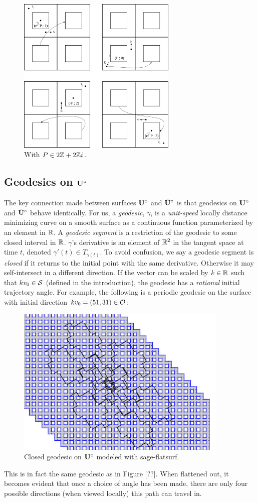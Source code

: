 \documentclass[a4paper, 11pt]{article}
\def\btUs{\btU^\circ}
\begin{document}
\begin{figure}[H]
\centering
\includegraphics[width=3in]{coverdirection.png}
\caption{With $P\in 2\mathbb{Z}+2\mathbb{Z} i$.}
\end{figure}

\noindent 

\subsection{Geodesics on $\mathbf{U}^\circ$}
The key connection made between surfaces $\mathbf{U}^\circ$ and $\btUs$ is that geodesics on $\mathbf{U}^\circ$ and $\btUs$ behave identically. For us, a \emph{geodesic}, $\gamma$, is a \emph{unit-speed} locally distance minimizing curve on a smooth surface as a continuous function parameterized by an element in $\mathbb{R}$. A \emph{geodesic segment} is a restriction of the geodesic to some closed interval in $\mathbb{R}$. $\gamma$'s derivative is an element of $\mathbb{R}^2$ in the tangent space at time $t$, denoted $\gamma'(t)\in T_{\gamma(t)}$. To avoid confusion, we say a geodesic segment is \emph{closed} if it returns to the initial point with the same derivative. Otherwise it may self-intersect in a different direction. If the vector can be scaled by $k\in\mathbb{R}$ such that $kv_0\in\mathcal{S}$ (defined in the introduction), the geodesic has a \emph{rational} initial trajectory angle. For example, the following is a periodic geodesic on the surface with initial direction $kv_0=(51,31)\in\mathcal{O}$:
\begin{figure}[H]
\centering
\includegraphics[width=4in]{closed2.png}
\caption{Closed geodesic on $\mathbf{U}^\circ$ modeled with sage-flatsurf.}
\label{fig:complicated}
\end{figure}
This is in fact the same geodesic as in Figure [??]. When flattened out, it becomes evident that once a choice of angle has been made, there are only four possible directions (when viewed locally) this path can travel in.
\end{document}
